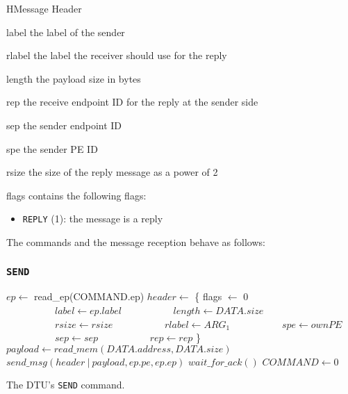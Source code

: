 \documentclass[a4paper,11pt,draft]{article}
\begin{document}
\begin{register}{H}{Message Header}{}
  \regnewline%
  \regnewline%
  \begin{regdesc}\begin{reglist}
    \item[label] the label of the sender
    \item[rlabel] the label the receiver should use for the reply
    \item[length] the payload size in bytes
    \item[rep] the receive endpoint ID for the reply at the sender side
    \item[sep] the sender endpoint ID
    \item[spe] the sender PE ID
    \item[rsize] the size of the reply message as a power of 2
    \item[flags] contains the following flags:
    \begin{itemize}
      \item \texttt{REPLY} (1): the message is a reply
    \end{itemize}
  \end{reglist}\end{regdesc}
\end{register}

\noindent The commands and the message reception behave as follows:

\subsubsection{\texttt{SEND}}

\begin{algorithm}[H]
    $ep \gets$ read\_ep(COMMAND.ep)\;
    \BlankLine
    \BlankLine
    $header \gets$ \{ flags $\gets$ 0\;
    $\quad\quad\quad\quad\quad label \gets ep.label$\;
    $\quad\quad\quad\quad\quad length \gets DATA.size$\;
    $\quad\quad\quad\quad\quad rsize \gets rsize$\;
    $\quad\quad\quad\quad\quad rlabel \gets ARG_1$\;
    $\quad\quad\quad\quad\quad spe \gets ownPE$\;
    $\quad\quad\quad\quad\quad sep \gets sep$\;
    $\quad\quad\quad\quad\quad rep \gets rep$ \}\;
    $payload \gets read\_mem(DATA.address, DATA.size)$\;
    $send\_msg(header\ |\ payload, ep.pe, ep.ep)$\;
    $wait\_for\_ack()$\;
    \BlankLine
    $COMMAND \gets 0$\;
    \caption{The DTU's \texttt{SEND} command.}
\end{algorithm}
\end{document}
